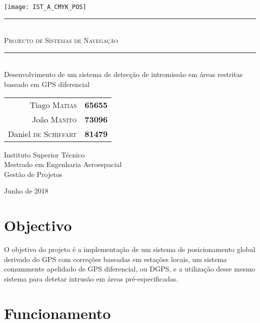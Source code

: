 \documentclass{article}
\begin{document}
\thispagestyle{empty}

\texttt{[image: IST\_A\_CMYK\_POS]}
	
\begin{center}
	\vspace{70mm} %
	\rule{\linewidth}{0.5pt} \\
    \vspace{2mm}
	\Huge \textsc{Projecto de Sistemas de Navegação} \\
	\rule{\linewidth}{2pt} \\
	\vspace{8mm} %
	\LARGE Desenvolvimento de um sistema de detecção de intromissão em áreas restritas baseado em GPS diferencial
	
	\vspace{\fill} %
	\large
	
	\begin{tabular}{r l}
		Tiago \textsc{Matias} & \textbf{65655} \\
		João \textsc{Manito} & \textbf{73096} \\
		Daniel \textsc{de Schiffart} & \textbf{81479}
	\end{tabular}
	
	\vspace{10mm} %
	\Large Instituto Superior Técnico \\
	Mestrado em Engenharia Aeroespacial \\
	\vspace{1mm}
	\large Gestão de Projetos
	
	\vspace{10mm} %
	\Large Junho de 2018
\end{center}

\newpage

\section{Objectivo}

O objetivo do projeto é a implementação de um sistema de
posicionamento global derivado do GPS com correções baseadas em
estações locais, um sistema comummente apelidado de GPS diferencial,
ou DGPS, e a utilização desse mesmo sistema para detetar intrusão em
áreas pré-especificadas.

\section{Funcionamento}
\end{document}
